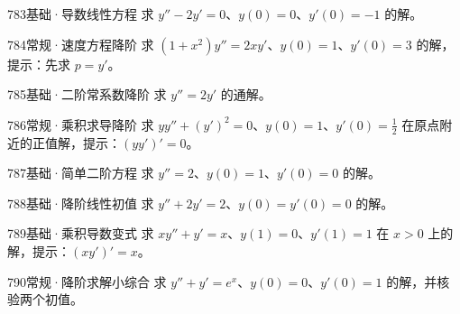 \begin{exercise}{783}{基础·导数线性方程}
求 $y''-2y'=0$、$y(0)=0$、$y'(0)=-1$ 的解。
\end{exercise}
\begin{exercise}{784}{常规·速度方程降阶}
求 $(1+x^2)y''=2xy'$、$y(0)=1$、$y'(0)=3$ 的解，提示：先求 $p=y'$。
\end{exercise}
\begin{exercise}{785}{基础·二阶常系数降阶}
求 $y''=2y'$ 的通解。
\end{exercise}
\begin{exercise}{786}{常规·乘积求导降阶}
求 $yy''+(y')^2=0$、$y(0)=1$、$y'(0)=\frac{1}{2}$ 在原点附近的正值解，提示：$(yy')'=0$。
\end{exercise}
\begin{exercise}{787}{基础·简单二阶方程}
求 $y''=2$、$y(0)=1$、$y'(0)=0$ 的解。
\end{exercise}
\begin{exercise}{788}{基础·降阶线性初值}
求 $y''+2y'=2$、$y(0)=y'(0)=0$ 的解。
\end{exercise}
\begin{exercise}{789}{基础·乘积导数变式}
求 $xy''+y'=x$、$y(1)=0$、$y'(1)=1$ 在 $x>0$ 上的解，提示：$(xy')'=x$。
\end{exercise}
\begin{exercise}{790}{常规·降阶求解小综合}
求 $y''+y'=e^x$、$y(0)=0$、$y'(0)=1$ 的解，并核验两个初值。
\end{exercise}
